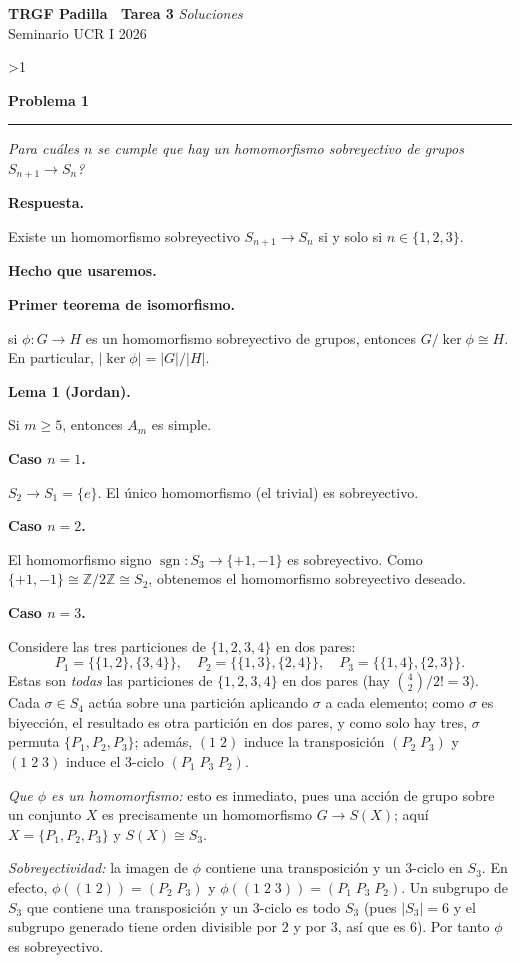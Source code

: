 \documentclass[10pt,a4paper]{article}
\newcommand{\ZZ}{\mathbb{Z}}
\newcommand{\inlinehead}[2][repblue]{%
  \par\smallskip
  {\color{#1}\bfseries #2.}\hspace{0.45em}%
}
\newcommand{\blockhead}[2][repteal]{%
  \par\smallskip
  {\color{#1}\bfseries #2.}\par\nobreak\smallskip
}
\newcommand{\answer}{\inlinehead{Respuesta}}
\newcommand{\subhead}[1]{\blockhead{#1}}
\newcommand{\notehead}[1]{\inlinehead[repgray]{#1}}
\newcommand{\topbanner}{%
  \begin{tcolorbox}[
    colback=replight,
    colframe=repline,
    borderline west={1.2pt}{0pt}{repblue},
    borderline east={1.2pt}{0pt}{repteal},
    left=1.0em,
    right=1.0em,
    top=0.7em,
    bottom=0.55em
  ]
    {\Large\bfseries\color{repblue} TRGF Padilla \textemdash\ Tarea 3}\hfill
    {\color{repaccent}\small\itshape Soluciones}\\[-0.1em]
    {\normalsize\color{repteal} Seminario UCR I 2026}
  \end{tcolorbox}
}
\newcounter{probcnt}
\newcommand{\problem}[2]{%
  \stepcounter{probcnt}%
  \ifnum\value{probcnt}>1\newpage\fi
  \par\vspace{0.25em}
  {\large\bfseries\color{repblue} Problema #1}\par
  {\color{repline}\rule{\linewidth}{0.55pt}}\par
  \begin{tcolorbox}[
    breakable,
    colback=white,
    colframe=repline,
    borderline west={1.6pt}{0pt}{repteal},
    left=0.7em,
    right=0.7em,
    top=0.35em,
    bottom=0.3em,
    before skip=0.35em,
    after skip=0.45em
  ]
    #2
  \end{tcolorbox}
}
\begin{document}
\color{black}
\topbanner
\small

\problem{1}{%
\textit{\textquestiondown Para cuáles $n$ se cumple que hay un homomorfismo sobreyectivo de grupos $S_{n+1} \to S_n$?}
}

\answer
Existe un homomorfismo sobreyectivo $S_{n+1}\to S_n$ si y solo si
$n\in\{1,2,3\}$.

\subhead{Hecho que usaremos}

\notehead{Primer teorema de isomorfismo}
si $\phi\colon G\to H$ es un homomorfismo sobreyectivo de grupos,
entonces $G/\ker\phi\cong H$. En particular,
$|\ker\phi|=|G|/|H|$.

\subhead{Lema 1 (Jordan)}
Si $m\ge 5$, entonces $A_m$ es simple.

\subhead{Caso $n=1$}
$S_2\to S_1=\{e\}$. El único homomorfismo (el trivial) es sobreyectivo.

\subhead{Caso $n=2$}
El homomorfismo signo $\operatorname{sgn}\colon S_3\to\{+1,-1\}$ es sobreyectivo.
Como $\{+1,-1\}\cong \ZZ/2\ZZ\cong S_2$, obtenemos el homomorfismo sobreyectivo deseado.

\subhead{Caso $n=3$}
Considere las tres particiones de $\{1,2,3,4\}$ en dos pares:
\[
  P_1=\bigl\{\{1,2\},\{3,4\}\bigr\},\quad
  P_2=\bigl\{\{1,3\},\{2,4\}\bigr\},\quad
  P_3=\bigl\{\{1,4\},\{2,3\}\bigr\}.
\]
Estas son \emph{todas} las particiones de $\{1,2,3,4\}$ en dos pares
(hay $\binom{4}{2}/2!=3$).
Cada $\sigma\in S_4$ actúa sobre una partición aplicando $\sigma$ a cada elemento;
como $\sigma$ es biyección, el resultado es otra partición en dos pares,
y como solo hay tres, $\sigma$ permuta $\{P_1,P_2,P_3\}$; además,
$(1\;2)$ induce la transposición $(P_2\;P_3)$ y $(1\;2\;3)$ induce
el $3$-ciclo $(P_1\;P_3\;P_2)$.

\textit{Que $\phi$ es un homomorfismo:} esto es inmediato, pues una acción
de grupo sobre un conjunto $X$ es precisamente un homomorfismo
$G\to S(X)$; aquí $X=\{P_1,P_2,P_3\}$ y $S(X)\cong S_3$.

\textit{Sobreyectividad:}
la imagen de $\phi$ contiene una transposición y un $3$-ciclo en $S_3$.
En efecto, $\phi((1\;2))=(P_2\;P_3)$ y $\phi((1\;2\;3))=(P_1\;P_3\;P_2)$.
Un subgrupo de $S_3$ que contiene una transposición y un $3$-ciclo es todo $S_3$
(pues $|S_3|=6$ y el subgrupo generado tiene orden divisible por $2$ y por $3$, así que es $6$).
Por tanto $\phi$ es sobreyectivo.
\end{document}
